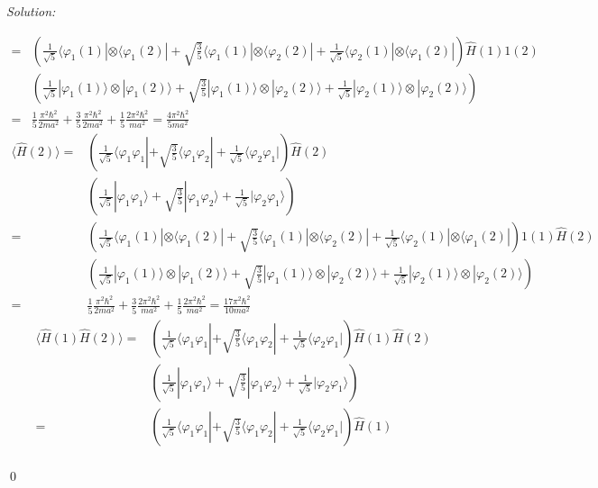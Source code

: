 \documentclass[12pt,a4paper]{article}
\newenvironment{sol}
    {\emph{Solution:}
    }
    {
    \qed
    }
\begin{document}
\begin{sol}
\begin{itemize}
\begin{itemize}
\begin{align}
\nonumber=&\left(\frac{1}{\sqrt{5}}\langle\varphi_1(1)|\otimes\langle\varphi_1(2)|+\sqrt{\frac{3}{5}}\langle\varphi_1(1)|\otimes\langle\varphi_2(2)|+\frac{1}{\sqrt{5}}\langle\varphi_2(1)|\otimes\langle\varphi_1(2)|\right)\hat{H}(1)1(2)\\
\nonumber&\left(\frac{1}{\sqrt{5}}|\varphi_1(1)\rangle\otimes|\varphi_1(2)\rangle+\sqrt{\frac{3}{5}}|\varphi_1(1)\rangle\otimes|\varphi_2(2)\rangle+\frac{1}{\sqrt{5}}|\varphi_2(1)\rangle\otimes|\varphi_2(2)\rangle\right)\\
=&\frac{1}{5}\frac{\pi^2\hbar^2}{2ma^2}+\frac{3}{5}\frac{\pi^2\hbar^2}{2ma^2}+\frac{1}{5}\frac{2\pi^2\hbar^2}{ma^2}=\frac{4\pi^2\hbar^2}{5ma^2}
\end{align}
\begin{align}
\nonumber\langle\hat{H}(2)\rangle=&\left(\frac{1}{\sqrt{5}}\langle\varphi_1\varphi_1|+\sqrt{\frac{3}{5}}\langle\varphi_1\varphi_2|+\frac{1}{\sqrt{5}}\langle\varphi_2\varphi_1|\right)\hat{H}(2)\\
\nonumber&\left(\frac{1}{\sqrt{5}}|\varphi_1\varphi_1\rangle+\sqrt{\frac{3}{5}}|\varphi_1\varphi_2\rangle+\frac{1}{\sqrt{5}}|\varphi_2\varphi_1\rangle\right)\\
\nonumber=&\left(\frac{1}{\sqrt{5}}\langle\varphi_1(1)|\otimes\langle\varphi_1(2)|+\sqrt{\frac{3}{5}}\langle\varphi_1(1)|\otimes\langle\varphi_2(2)|+\frac{1}{\sqrt{5}}\langle\varphi_2(1)|\otimes\langle\varphi_1(2)|\right)1(1)\hat{H}(2)\\
\nonumber&\left(\frac{1}{\sqrt{5}}|\varphi_1(1)\rangle\otimes|\varphi_1(2)\rangle+\sqrt{\frac{3}{5}}|\varphi_1(1)\rangle\otimes|\varphi_2(2)\rangle+\frac{1}{\sqrt{5}}|\varphi_2(1)\rangle\otimes|\varphi_2(2)\rangle\right)\\
=&\frac{1}{5}\frac{\pi^2\hbar^2}{2ma^2}+\frac{3}{5}\frac{2\pi^2\hbar^2}{ma^2}+\frac{1}{5}\frac{2\pi^2\hbar^2}{ma^2}=\frac{17\pi^2\hbar^2}{10ma^2}
\end{align}
\begin{align}
\nonumber\langle\hat{H}(1)\hat{H}(2)\rangle=&\left(\frac{1}{\sqrt{5}}\langle\varphi_1\varphi_1|+\sqrt{\frac{3}{5}}\langle\varphi_1\varphi_2|+\frac{1}{\sqrt{5}}\langle\varphi_2\varphi_1|\right)\hat{H}(1)\hat{H}(2)\\
\nonumber&\left(\frac{1}{\sqrt{5}}|\varphi_1\varphi_1\rangle+\sqrt{\frac{3}{5}}|\varphi_1\varphi_2\rangle+\frac{1}{\sqrt{5}}|\varphi_2\varphi_1\rangle\right)\\
\nonumber=&\left(\frac{1}{\sqrt{5}}\langle\varphi_1\varphi_1|+\sqrt{\frac{3}{5}}\langle\varphi_1\varphi_2|+\frac{1}{\sqrt{5}}\langle\varphi_2\varphi_1|\right)\hat{H}(1)\\

\end{align}
\end{itemize}
\end{itemize}
\end{sol}
\end{document}
